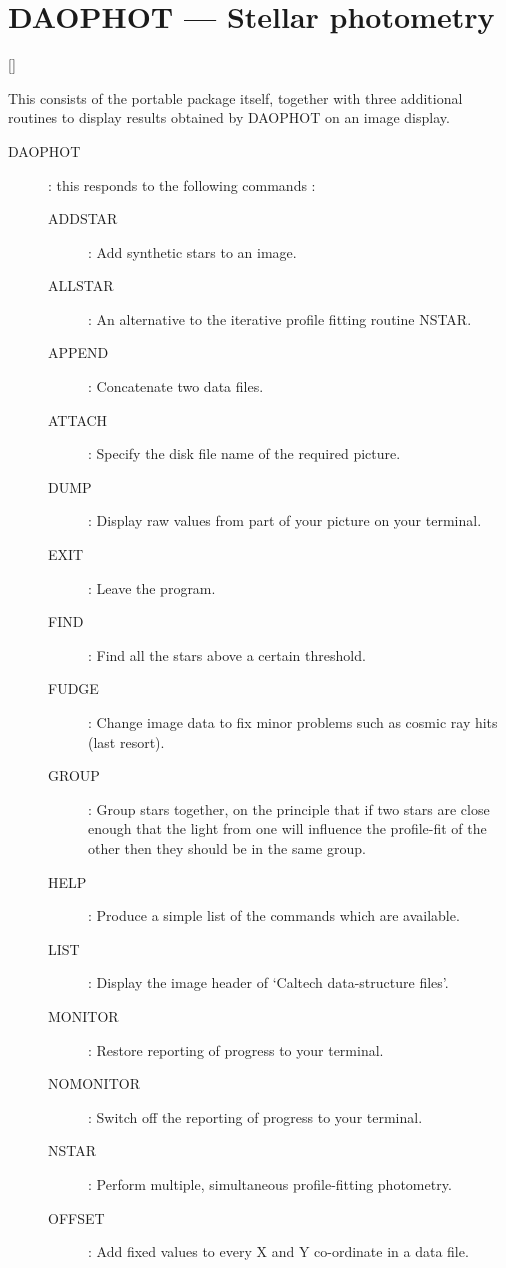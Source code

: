 \newpage

\section{DAOPHOT --- Stellar photometry}

\vspace{-10mm}

\hfill []

\vspace{2mm}

This consists of the portable package itself, together with three additional
routines to display results obtained by DAOPHOT on an image display.
\begin{description}
\item [DAOPHOT] : this responds to the following commands :
\begin{description}
\item [ADDSTAR] : Add synthetic stars to an image.
\item [ALLSTAR] : An alternative to the iterative profile fitting routine NSTAR.
\item [APPEND] : Concatenate two data files.
\item [ATTACH] : Specify the disk file name of the required picture.
\item [DUMP] : Display raw values from part of your picture on your terminal.
\item [EXIT] : Leave the program.
\item [FIND] : Find all the stars above a certain threshold.
\item [FUDGE] : Change image data to fix minor problems such as cosmic ray hits
 (last resort).
\item [GROUP] : Group stars together, on the principle that if two stars are
 close enough that the light from one will influence the profile-fit of the
 other then they should be in the same group.
\item [HELP] : Produce a simple list of the commands which are available.
\item [LIST] : Display the image header of `Caltech data-structure files'.
\item [MONITOR] : Restore reporting of progress to your terminal.
\item [NOMONITOR] : Switch off the reporting of progress to your terminal.
\item [NSTAR] : Perform multiple, simultaneous profile-fitting photometry.
\item [OFFSET] : Add fixed values to every X and Y co-ordinate in a data file.

\end{description}
\end{description}
